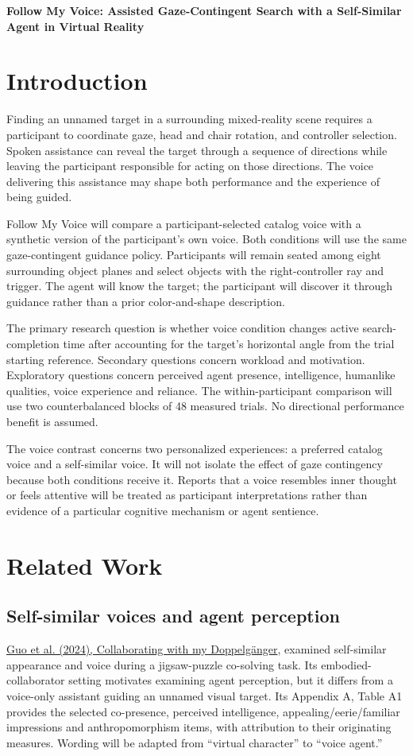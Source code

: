 \documentclass[11pt,letterpaper]{article}
\begin{document}
{\LARGE\bfseries Follow My Voice: Assisted Gaze-Contingent Search with a Self-Similar Agent in Virtual Reality}\par
\section{Introduction}
Finding an unnamed target in a surrounding mixed-reality scene requires a participant to coordinate gaze, head and chair rotation, and controller selection. Spoken assistance can reveal the target through a sequence of directions while leaving the participant responsible for acting on those directions. The voice delivering this assistance may shape both performance and the experience of being guided.

Follow My Voice will compare a participant-selected catalog voice with a synthetic version of the participant's own voice. Both conditions will use the same gaze-contingent guidance policy. Participants will remain seated among eight surrounding object planes and select objects with the right-controller ray and trigger. The agent will know the target; the participant will discover it through guidance rather than a prior color-and-shape description.

The primary research question is whether voice condition changes active search-completion time after accounting for the target's horizontal angle from the trial starting reference. Secondary questions concern workload and motivation. Exploratory questions concern perceived agent presence, intelligence, humanlike qualities, voice experience and reliance. The within-participant comparison will use two counterbalanced blocks of 48 measured trials. No directional performance benefit is assumed.

The voice contrast concerns two personalized experiences: a preferred catalog voice and a self-similar voice. It will not isolate the effect of gaze contingency because both conditions receive it. Reports that a voice resembles inner thought or feels attentive will be treated as participant interpretations rather than evidence of a particular cognitive mechanism or agent sentience.
\section{Related Work}
\subsection{Self-similar voices and agent perception}
\href{https://doi.org/10.1145/3651288}{Guo et al. (2024), Collaborating with my Doppelg\"anger}, examined self-similar appearance and voice during a jigsaw-puzzle co-solving task. Its embodied-collaborator setting motivates examining agent perception, but it differs from a voice-only assistant guiding an unnamed visual target. Its Appendix A, Table A1 provides the selected co-presence, perceived intelligence, appealing/eerie/familiar impressions and anthropomorphism items, with attribution to their originating measures. Wording will be adapted from ``virtual character'' to ``voice agent.''
\end{document}
